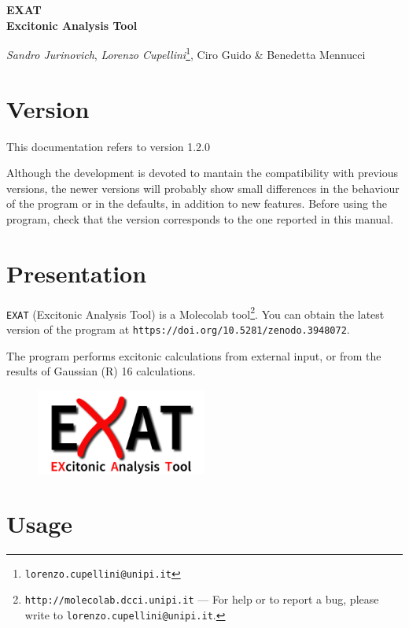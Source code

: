 \documentclass[a4paper,11pt]{article}
\begin{document}
\Large
\begin{center}
\textbf{EXAT \\ Excitonic Analysis Tool}
\end{center}
\normalsize
\begin{center}
\emph{Sandro Jurinovich},
\emph{Lorenzo Cupellini}\footnote{\texttt{lorenzo.cupellini@unipi.it}},
 Ciro Guido \& Benedetta Mennucci
\end{center}

\section{Version}

This documentation refers to version 1.2.0 

Although the development is devoted to mantain the compatibility with previous versions, the newer versions will probably show small differences in the behaviour of the program or in the defaults, in addition to new features. Before using the program, check that the version corresponds to the one reported in this manual.

\section{Presentation}

\texttt{EXAT} (Excitonic Analysis Tool) is a Molecolab tool\footnote{\texttt{http://molecolab.dcci.unipi.it} ---
For help or to report a bug, please write to
\texttt{lorenzo.cupellini@unipi.it}.}. You can obtain the latest version of the program at \texttt{https://doi.org/10.5281/zenodo.3948072}.

The program performs excitonic calculations from external input, or from the results of Gaussian (R) 16 calculations.

\begin{figure}[!hb]
 \centering
 \includegraphics[width=0.5\textwidth]{logo.png}
\end{figure}


\section{Usage}
\end{document}
